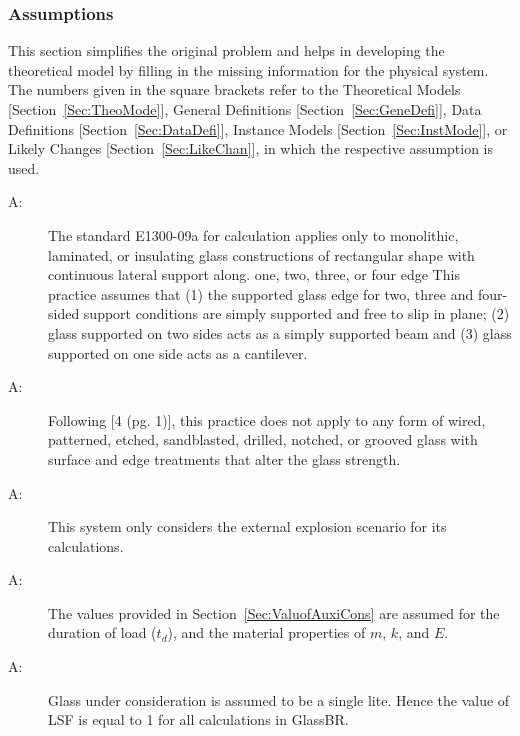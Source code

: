 \documentclass[12pt]{article}
\newcounter{assumpnum}
\newcommand{\atheassumpnum}{A\theassumpnum}
\begin{document}
\subsubsection{Assumptions}
\label{Sec:Assu}
This section simplifies the original problem and helps in developing the theoretical model by filling in the missing information for the physical system. The numbers given in the square brackets refer to the Theoretical Models {[}Section~\ref{Sec:TheoMode}{]}, General Definitions {[}Section~\ref{Sec:GeneDefi}{]}, Data Definitions {[}Section~\ref{Sec:DataDefi}{]}, Instance Models {[}Section~\ref{Sec:InstMode}{]}, or Likely Changes {[}Section~\ref{Sec:LikeChan}{]}, in which the respective assumption is used.
\begin{description}
\item[\atheassumpnum\label{A:assumption1}:]The standard E1300-09a for calculation applies only to monolithic, laminated, or insulating glass constructions of rectangular shape with continuous lateral support along. one, two, three, or four edge This practice assumes that (1) the supported glass edge for two, three and four-sided support conditions are simply supported and free to slip in plane; (2) glass supported on two sides acts as a simply supported beam and (3) glass supported on one side acts as a cantilever.
\end{description}
\begin{description}
\item[\atheassumpnum\label{A:assumption2}:]Following {[}4 (pg. 1){]}, this practice does not apply to any form of wired, patterned, etched, sandblasted, drilled, notched, or grooved glass with surface and edge treatments that alter the glass strength.
\end{description}
\begin{description}
\item[\atheassumpnum\label{A:assumption3}:]This system only considers the external explosion scenario for its calculations.
\end{description}
\begin{description}
\item[\atheassumpnum\label{A:assumption4}:]The values provided in Section~\ref{Sec:ValuofAuxiCons} are assumed for the duration of load (${t_{d}}$), and the material properties of $m$, $k$, and $E$.
\end{description}
\begin{description}
\item[\atheassumpnum\label{A:assumption5}:]Glass under consideration is assumed to be a single lite. Hence the value of LSF is equal to 1 for all calculations in GlassBR.
\end{description}
\end{document}
